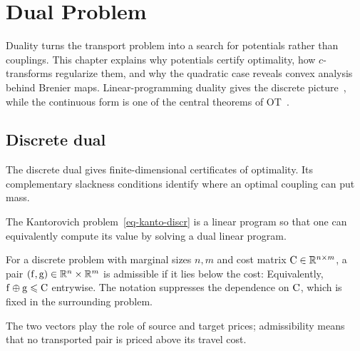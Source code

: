 
\chapter{Dual Problem}
\label{sec-dual}

Duality turns the transport problem into a search for potentials rather than couplings. This chapter explains why potentials certify optimality, how $c$-transforms regularize them, and why the quadratic case reveals convex analysis behind Brenier maps. Linear-programming duality gives the discrete picture~\cite{bertsimas1997introduction}, while the continuous form is one of the central theorems of OT~\cite{Villani03,SantambrogioBook}.

\section{Discrete dual}
\label{sec-discrete-dual}


The discrete dual gives finite-dimensional certificates of optimality. Its complementary slackness conditions identify where an optimal coupling can put mass.

The Kantorovich problem~\eqref{eq-kanto-discr} is a linear program so that one can equivalently compute its value by solving a dual linear program.


\begin{defn}\label{def-admissible-potentials}
	For a discrete problem with marginal sizes $n,m$ and cost matrix $\mathrm{C}\in\mathbb{R}^{n\times m}$, a pair $(\mathrm{f},\mathrm{g})\in\mathbb{R}^n\times\mathbb{R}^m$ is admissible if it lies below the cost:
	Equivalently, $\mathrm{f}\oplus\mathrm{g}\leqslant\mathrm{C}$ entrywise. The notation suppresses the dependence on $\mathrm{C}$, which is fixed in the surrounding problem.
\end{defn}
The two vectors play the role of source and target prices; admissibility means that no transported pair is priced above its travel cost.

